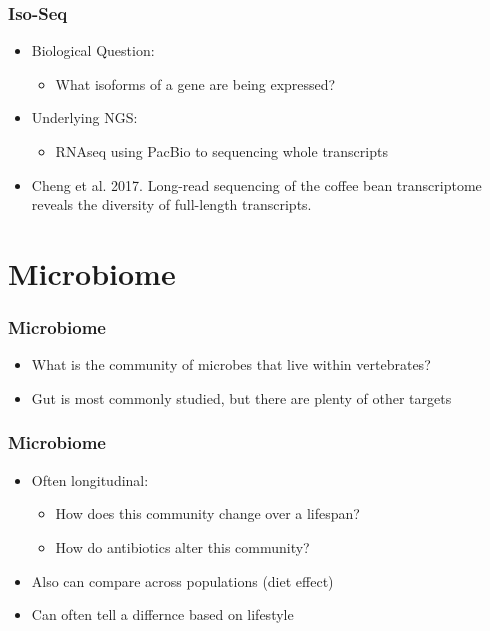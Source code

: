 \documentclass[14pt]{beamer}
\begin{document}
\begin{frame}
\frametitle{Iso-Seq}
\begin{itemize}
	\item<+-> Biological Question:
	\begin{itemize}
		\item<+-> What isoforms of a gene are being expressed?
	\end{itemize}
	\item<+-> Underlying NGS:
	\begin{itemize}
		\item<+-> RNAseq using PacBio to sequencing whole transcripts
	\end{itemize}
	\item<+-> Cheng et al. 2017. Long-read sequencing of the coffee bean transcriptome reveals the diversity of full-length transcripts.
\end{itemize}
\end{frame}

\section{Microbiome}

\begin{frame}
\frametitle{Microbiome}
\begin{itemize}
	\item<+-> What is the community of microbes that live within vertebrates?
	\item<+-> Gut is most commonly studied, but there are plenty of other targets
\end{itemize}
\end{frame}

\begin{frame}
\frametitle{Microbiome}
\begin{itemize}
	\item<+-> Often longitudinal:
	\begin{itemize}
		\item<+-> How does this community change over a lifespan?
		\item<+-> How do antibiotics alter this community?
	\end{itemize}
	\item<+-> Also can compare across populations (diet effect)
	\item<+-> Can often tell a differnce based on lifestyle 
\end{itemize}
\end{frame}
\end{document}
